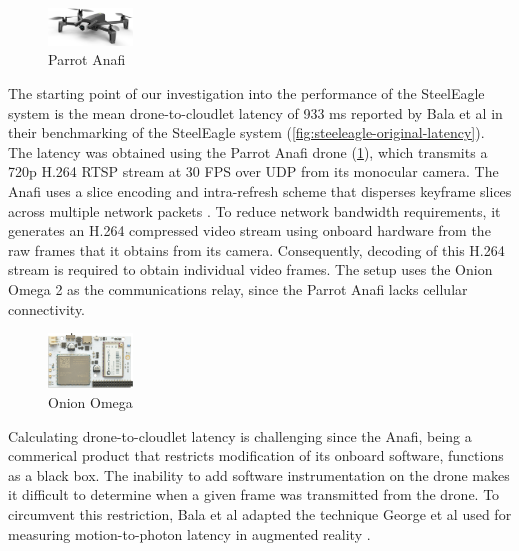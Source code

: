 \begin{figure}
    \centering
    \includegraphics[width=0.2\textwidth]{figs/parrot-anafi.pdf}
    \caption{Parrot Anafi}
    \label{fig:parrot-anafi}
\end{figure}
The starting point of our investigation into the performance of the SteelEagle
system is the mean drone-to-cloudlet latency of 933 ms reported by Bala et al
in their benchmarking of the SteelEagle system
(\cref{fig:steeleagle-original-latency}). The latency was obtained using the
Parrot Anafi drone (\cref{fig:parrot-anafi}), which transmits a 720p H.264 RTSP
stream at 30 FPS over UDP from its monocular camera.  The Anafi uses a slice
encoding and intra-refresh scheme that disperses keyframe slices across
multiple network packets \cite{anafi_white_paper}. To reduce network bandwidth
requirements, it generates an H.264 compressed video stream using onboard
hardware from the raw frames that it obtains from its camera. Consequently,
decoding of this H.264 stream is required to obtain individual video frames.
The setup uses the Onion Omega 2 as the communications relay, since the Parrot
Anafi lacks cellular connectivity.

\begin{figure}
    \centering
    \vspace{-1mm}
    \includegraphics[width=0.2\textwidth]{figs/onion-omega.png}
    \caption{Onion Omega}
    \label{fig:onion-omega}
    \vspace{-1mm}
\end{figure}
Calculating drone-to-cloudlet latency is challenging since the Anafi, being a
commerical product that restricts modification of its onboard software,
functions as a black box. The inability to add software instrumentation on the
drone makes it difficult to determine when a given frame was transmitted from
the drone. To circumvent this restriction, Bala et al adapted the technique
George et al used for measuring motion-to-photon latency in augmented reality
\cite{george20}.


